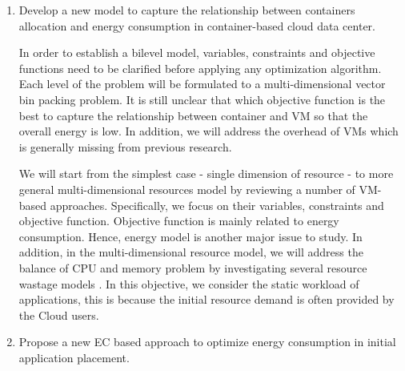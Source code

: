 \begin{enumerate}
	\item Develop a new model to capture the relationship between containers allocation and energy consumption in container-based cloud data center.


	In order to establish a bilevel model, variables, constraints and objective functions need to be clarified before applying any optimization algorithm. Each level of the problem will be formulated to a multi-dimensional vector bin packing problem. It is still unclear that which objective function is the best to capture the relationship between container and VM so that the overall energy is low. In addition, we will address the overhead of VMs which is generally missing from previous research.

	We will start from the simplest case - single dimension of resource - to more general multi-dimensional resources model by reviewing a number of VM-based approaches. Specifically, we focus on their variables, constraints and objective function. Objective function is mainly related to energy consumption. Hence, energy model is another major issue to study. In addition, in the multi-dimensional resource model, we will address the balance of CPU and memory problem by investigating several resource wastage models \cite{Ferdaus:2014ep, Xu:2010vh, Gao:2013gg}. In this objective, we consider the static workload of applications, this is because the initial resource demand is often provided by the Cloud users.

	\item Propose a new EC based approach to optimize energy consumption in initial application placement. 


\end{enumerate}
